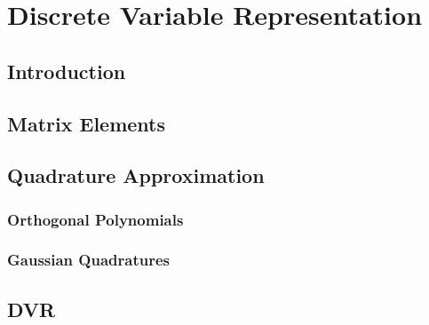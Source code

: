 \chapter{Discrete Variable Representation}
\section{Introduction}
\section{Matrix Elements}
\section{Quadrature Approximation}
\subsection{Orthogonal Polynomials}
\subsection{Gaussian Quadratures}
\section{DVR}

